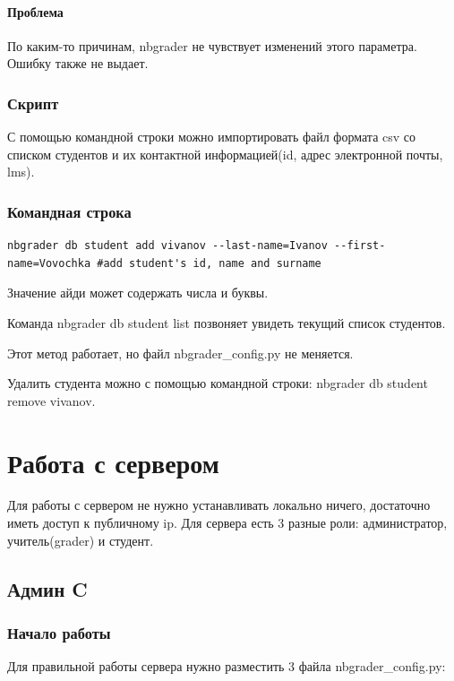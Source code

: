 \documentclass[a4paper,12pt]{article}
\begin{document}
\paragraph{Проблема}По каким-то причинам, nbgrader не чувствует изменений этого параметра. Ошибку также не выдает.
\subsubsection{Скрипт}

С помощью командной строки можно импортировать файл формата csv со списком студентов и их контактной информацией(id, адрес электронной почты, lms).
\subsubsection{Командная строка}

\begin{verbatim} 
nbgrader db student add vivanov --last-name=Ivanov --first-name=Vovochka #add student's id, name and surname
\end{verbatim}
Значение айди может содержать числа и буквы.

Команда nbgrader db student list позвоняет увидеть текущий список студентов.

Этот метод работает, но файл nbgrader\_config.py не меняется.

Удалить студента можно с помощью командной строки: nbgrader db student remove vivanov.
\section{Работа с сервером}

Для работы с сервером не нужно устанавливать локально ничего, достаточно иметь доступ к публичному ip. Для сервера есть 3 разные роли: администратор, учитель(grader) и студент.

\subsection{Админ C} 
\subsubsection{Начало работы}
Для правильной работы сервера нужно разместить 3 файла nbgrader\_config.py:
\end{document}
